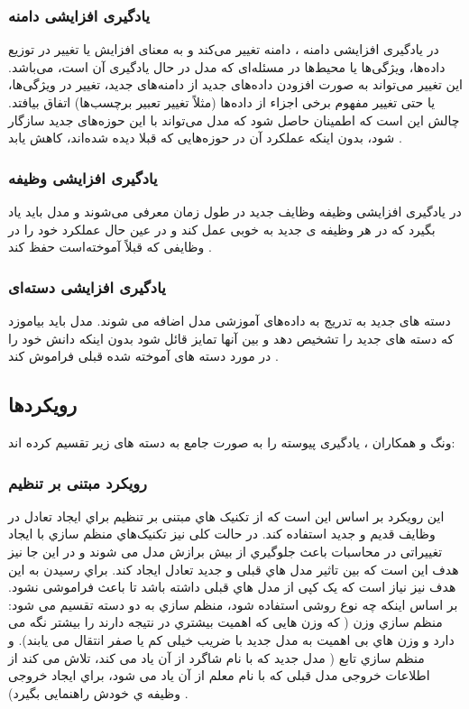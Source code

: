\subsubsection{یادگیری افزایشی دامنه}
 در یادگیری افزایشی دامنه
 ، دامنه تغییر می‌کند و به معنای افزایش یا تغییر در توزیع داده‌ها، ویژگی‌ها یا محیط‌ها در مسئله‌ای که مدل در حال یادگیری آن است، می‌باشد. این تغییر می‌تواند به صورت افزودن داده‌های جدید از دامنه‌های جدید، تغییر در ویژگی‌ها، یا حتی تغییر مفهوم برخی اجزاء از داده‌ها (مثلاً تغییر تعبیر برچسب‌ها) اتفاق بیافتد. چالش این است که اطمینان حاصل شود که مدل می‌تواند با این حوزه‌های جدید سازگار شود، بدون اینکه عملکرد آن در حوزه‌هایی که قبلا دیده شده‌اند، کاهش یابد
\cite{2,3,4}.
\subsubsection{یادگیری افزایشی وظیفه}
در یادگیری افزایشی وظیفه  
وظایف جدید در طول زمان معرفی می‌شوند و مدل باید یاد بگیرد که در هر وظیفه ی جدید به خوبی عمل کند و در عین حال عملکرد خود را در وظایفی که قبلاً آموخته‌است حفظ کند
\cite{3}.
\subsubsection{یادگیری افزایشی دسته‌ای}
دسته های جدید به تدریج به داده‌های آموزشی مدل اضافه می شوند. مدل باید بیاموزد که دسته های جدید را تشخیص دهد و بین آنها تمایز قائل شود بدون اینکه دانش خود را در مورد دسته های آموخته شده قبلی فراموش کند
\cite{2,3,5,6}.
\subsection{رویکردها}
ونگ و همکاران 
\cite{1}
، یادگیری پیوسته را به صورت جامع به دسته های زیر تقسیم کرده اند:
\subsubsection{رویکرد مبتنی بر تنظیم}
این رویکرد بر اساس این است که از تکنیک هاي مبتنی بر تنظیم
براي ایجاد تعادل در وظایف قدیم و جدید استفاده کند. در حالت کلی نیز تکنیک‌هاي منظم سازي با ایجاد تغییراتی در محاسبات باعث جلوگیري از بیش برازش مدل می شوند و در این جا نیز هدف این است که بین تاثیر مدل هاي قبلی و جدید تعادل ایجاد کند. براي رسیدن به این هدف نیز نیاز است که یک کپی از مدل هاي قبلی داشته باشد تا باعث فراموشی نشود. بر اساس اینکه چه نوع روشی استفاده شود، منظم سازي به دو دسته تقسیم می شود: منظم سازي وزن ( که وزن هایی که اهمیت بیشتري در نتیجه دارند را بیشتر نگه می دارد و وزن هاي بی اهمیت به مدل جدید با ضریب خیلی کم یا صفر انتقال می یابند). و منظم سازي تابع ( مدل جدید که با نام شاگرد از آن یاد می کند، تلاش می کند از اطلاعات خروجی مدل قبلی که با نام معلم از آن یاد می شود، براي ایجاد خروجی وظیفه ي خودش راهنمایی بگیرد) 
\cite{7,8}.
